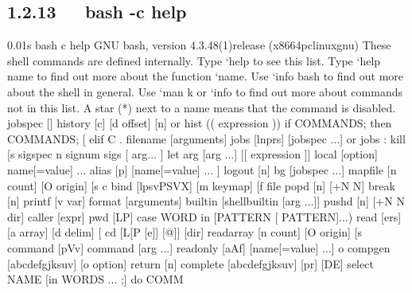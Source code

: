 \documentclass[letterpaper,12pt,english]{sphinxmanual}
\begin{document}
\subsection{1.2.13   bash -c help}
\label{\detokenize{001software/001install/linux:bash-c-help}}
\begin{sphinxVerbatim}[commandchars=\\\{\}]
0.01s\PYGZdl{} bash \PYGZhy{}c help
GNU bash, version 4.3.48(1)\PYGZhy{}release (x86\PYGZus{}64\PYGZhy{}pc\PYGZhy{}linux\PYGZhy{}gnu)
These shell commands are defined internally.  Type {}`help\PYGZsq{} to see this list.
Type {}`help name\PYGZsq{} to find out more about the function {}`name\PYGZsq{}.
Use {}`info bash\PYGZsq{} to find out more about the shell in general.
Use {}`man \PYGZhy{}k\PYGZsq{} or {}`info\PYGZsq{} to find out more about commands not in this list.
A star (*) next to a name means that the command is disabled.
 job\PYGZus{}spec [\PYGZam{}]                            history [\PYGZhy{}c] [\PYGZhy{}d offset] [n] or hist\PYGZgt{}
 (( expression ))                        if COMMANDS; then COMMANDS; [ elif C\PYGZgt{}
 . filename [arguments]                  jobs [\PYGZhy{}lnprs] [jobspec ...] or jobs \PYGZgt{}
 :                                       kill [\PYGZhy{}s sigspec \textbar{} \PYGZhy{}n signum \textbar{} \PYGZhy{}sigs\PYGZgt{}
 [ arg... ]                              let arg [arg ...]
 [[ expression ]]                        local [option] name[=value] ...
 alias [\PYGZhy{}p] [name[=value] ... ]          logout [n]
 bg [job\PYGZus{}spec ...]                       mapfile [\PYGZhy{}n count] [\PYGZhy{}O origin] [\PYGZhy{}s c\PYGZgt{}
 bind [\PYGZhy{}lpsvPSVX] [\PYGZhy{}m keymap] [\PYGZhy{}f file\PYGZgt{}  popd [\PYGZhy{}n] [+N \textbar{} \PYGZhy{}N]
 break [n]                               printf [\PYGZhy{}v var] format [arguments]
 builtin [shell\PYGZhy{}builtin [arg ...]]       pushd [\PYGZhy{}n] [+N \textbar{} \PYGZhy{}N \textbar{} dir]
 caller [expr]                           pwd [\PYGZhy{}LP]
 case WORD in [PATTERN [\textbar{} PATTERN]...)\PYGZgt{}  read [\PYGZhy{}ers] [\PYGZhy{}a array] [\PYGZhy{}d delim] [\PYGZhy{}\PYGZgt{}
 cd [\PYGZhy{}L\textbar{}[\PYGZhy{}P [\PYGZhy{}e]] [\PYGZhy{}@]] [dir]            readarray [\PYGZhy{}n count] [\PYGZhy{}O origin] [\PYGZhy{}s\PYGZgt{}
 command [\PYGZhy{}pVv] command [arg ...]        readonly [\PYGZhy{}aAf] [name[=value] ...] o\PYGZgt{}
 compgen [\PYGZhy{}abcdefgjksuv] [\PYGZhy{}o option]  \PYGZgt{}  return [n]
 complete [\PYGZhy{}abcdefgjksuv] [\PYGZhy{}pr] [\PYGZhy{}DE] \PYGZgt{}  select NAME [in WORDS ... ;] do COMM\PYGZgt{}

\end{sphinxVerbatim}
\end{document}
